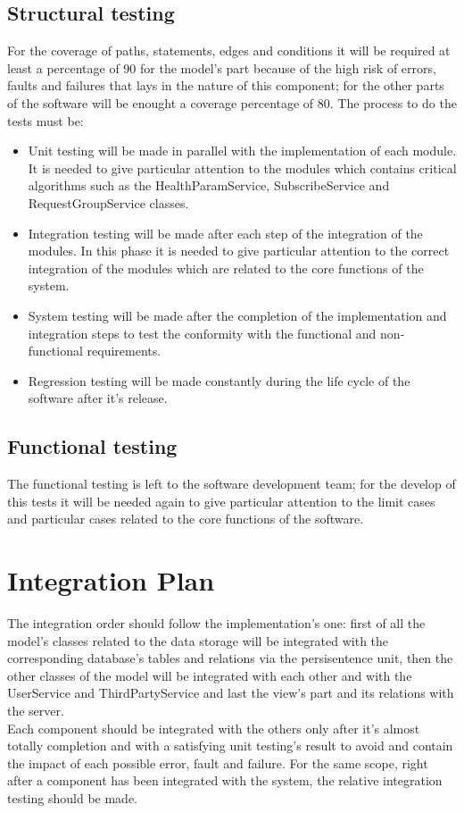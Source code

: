 \subsection{Structural testing}
For the coverage of paths, statements, edges and conditions it will be required at least a percentage of 90 for the model's part because of the high risk of errors, faults and failures that lays 	in the nature of this component; for the other parts of the software will be enought a coverage percentage of 80. The process to do the tests must be: 
	\begin{itemize}
		\item Unit testing will be made in parallel with the implementation of each module. It is needed to give particular 					attention to the modules which contains critical algorithms such as the HealthParamService, SubscribeService and 				RequestGroupService classes.
		\item Integration testing will be made after each step of the integration of the modules. In this phase it is needed to 				give particular attention to the correct integration of the modules which are related to the core functions of the system.
		\item System testing will be made after the completion of the implementation and integration steps to test the 					conformity with the functional and non-functional requirements.
		\item Regression testing will be made constantly during the life cycle of the software after it's release. 
	\end{itemize}
\subsection{Functional testing}
	The functional testing is left to the software development team; for the develop of this tests it will be needed again to give particular attention to the limit cases and particular cases 		related to the core functions of the software.
\section{Integration Plan}
The integration order should follow the implementation's one: first of all the model's classes related to the data storage will be integrated with the corresponding database's tables and relations via the persisentence unit, then  the other classes of the model will be integrated with each other and with the UserService and ThirdPartyService and last the view's part and its relations with the server.\\ 
Each component should be integrated with the others only after it's almost totally completion and with a satisfying unit testing's result to avoid and contain the impact of each possible error, fault and failure. For the same scope, right after a component has been integrated with the system, the relative integration testing should be made. 






